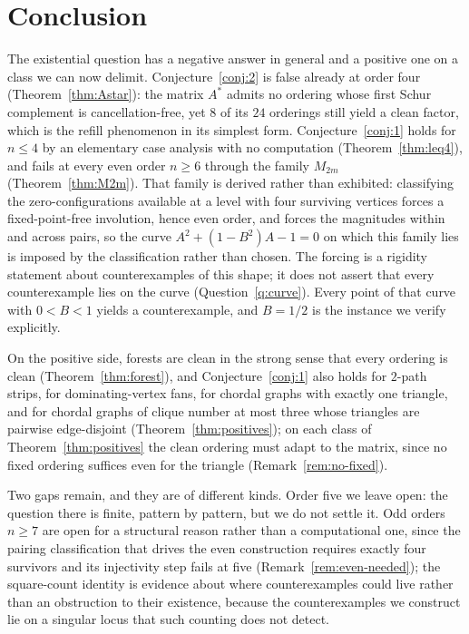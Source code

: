 \documentclass[11pt]{article}
\theoremstyle{plain}
\theoremstyle{definition}
\theoremstyle{remark}
\begin{document}
\section{Conclusion}
\begin{humanblock}
The existential question has a negative answer in general and a positive one on a class we can now
delimit. Conjecture~\ref{conj:2} is false already at order four (Theorem~\ref{thm:Astar}): the matrix
$A^*$ admits no ordering whose first Schur complement is cancellation-free, yet $8$ of its $24$
orderings still yield a clean factor, which is the refill phenomenon in its simplest form.
Conjecture~\ref{conj:1} holds for $n\le4$ by an elementary case analysis with no computation
(Theorem~\ref{thm:leq4}), and fails at every even order $n\ge6$ through the family $M_{2m}$
(Theorem~\ref{thm:M2m}). That family is derived rather than exhibited: classifying the
zero-configurations available at a level with four surviving vertices forces a fixed-point-free
involution, hence even order, and forces the magnitudes within and across pairs, so the curve
$A^2+(1-B^2)A-1=0$ on which this family lies is imposed by the classification rather than chosen. The
forcing is a rigidity statement about counterexamples of this shape; it does not assert that every
counterexample lies on the curve (Question~\ref{q:curve}). Every point of that curve with $0<B<1$
yields a counterexample, and $B=1/2$ is the instance we
verify explicitly.

On the positive side, forests are clean in the strong sense that every ordering is clean
(Theorem~\ref{thm:forest}), and Conjecture~\ref{conj:1} also holds for $2$-path strips, for
dominating-vertex fans, for chordal graphs with exactly one triangle, and for chordal graphs of
clique number at most three whose triangles are pairwise edge-disjoint (Theorem~\ref{thm:positives});
on each class of Theorem~\ref{thm:positives} the clean ordering must adapt to the matrix, since no
fixed ordering suffices even for the triangle (Remark~\ref{rem:no-fixed}).

Two gaps remain, and they are of different kinds. Order five we leave open: the question there is
finite, pattern by pattern, but we do not settle it. Odd orders $n\ge7$ are open for a structural
reason rather than a computational one, since the pairing classification that drives the even
construction requires exactly four survivors and its injectivity step fails at five
(Remark~\ref{rem:even-needed}); the square-count identity is evidence about where counterexamples
could live rather than an obstruction to their existence, because the counterexamples we construct lie
on a singular locus that such counting does not detect.


\end{humanblock}
\end{document}
